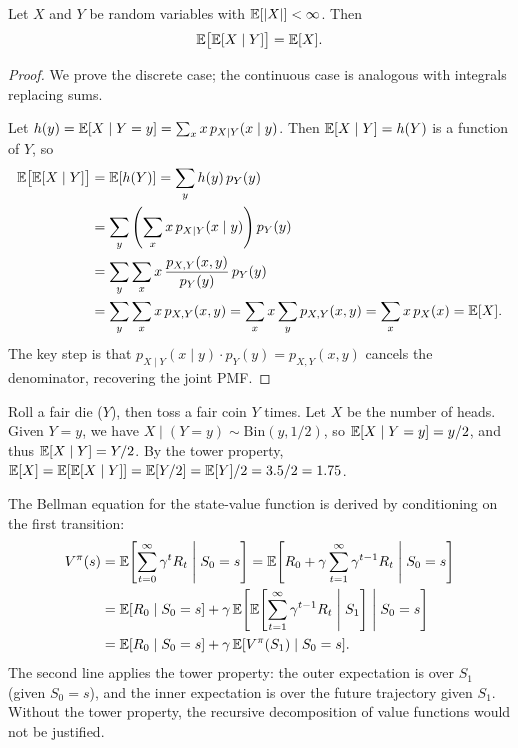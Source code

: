 \documentclass[11pt,a4paper]{article}
\begin{document}
\begin{theorem}
\label{thm:tower}
Let $X$ and $Y$ be random variables with $\mathbb{E}[|X|] < \infty$. Then
\[
    \mathbb{E}\bigl[\mathbb{E}[X \mid Y]\bigr] = \mathbb{E}[X].
\]
\end{theorem}

\begin{proof}
We prove the discrete case; the continuous case is analogous with
integrals replacing sums.

Let $h(y) = \mathbb{E}[X \mid Y = y] = \sum_x x \, p_{X \mid Y}(x \mid y)$.
Then $\mathbb{E}[X \mid Y] = h(Y)$ is a function of $Y$, so
\begin{align*}
    \mathbb{E}\bigl[\mathbb{E}[X \mid Y]\bigr]
    &= \mathbb{E}[h(Y)]
    = \sum_y h(y) \, p_Y(y) \\
    &= \sum_y \left(\sum_x x \, p_{X \mid Y}(x \mid y)\right) p_Y(y) \\
    &= \sum_y \sum_x x \, \frac{p_{X,Y}(x,y)}{p_Y(y)} \, p_Y(y) \\
    &= \sum_y \sum_x x \, p_{X,Y}(x,y)
    = \sum_x x \sum_y p_{X,Y}(x,y)
    = \sum_x x \, p_X(x) = \mathbb{E}[X].
\end{align*}
The key step is that $p_{X\mid Y}(x \mid y) \cdot p_Y(y) = p_{X,Y}(x,y)$
cancels the denominator, recovering the joint PMF.
\end{proof}

\begin{example}
\label{ex:tower_concrete}
Roll a fair die ($Y$), then toss a fair coin $Y$ times. Let $X$ be the
number of heads. Given $Y = y$, we have
$X \mid (Y = y) \sim \mathrm{Bin}(y, 1/2)$, so
$\mathbb{E}[X \mid Y = y] = y/2$, and thus $\mathbb{E}[X \mid Y] = Y/2$.
By the tower property,
$\mathbb{E}[X] = \mathbb{E}[\mathbb{E}[X \mid Y]] = \mathbb{E}[Y/2] = \mathbb{E}[Y]/2 = 3.5/2 = 1.75$.
\end{example}

\begin{rlconnection}[title={Tower Property and the Bellman Equation}]
The Bellman equation for the state-value function is derived by
conditioning on the first transition:
\begin{align*}
    V^\pi(s) &= \mathbb{E}\!\left[\sum_{t=0}^\infty \gamma^t R_t
    \;\middle|\; S_0 = s\right]
    = \mathbb{E}\!\left[R_0 + \gamma \sum_{t=1}^\infty \gamma^{t-1} R_t
    \;\middle|\; S_0 = s\right] \\
    &= \mathbb{E}[R_0 \mid S_0 = s]
    + \gamma \, \mathbb{E}\!\left[\mathbb{E}\!\left[\sum_{t=1}^\infty
    \gamma^{t-1} R_t \;\middle|\; S_1\right]
    \;\middle|\; S_0 = s\right] \\
    &= \mathbb{E}[R_0 \mid S_0 = s] + \gamma \, \mathbb{E}[V^\pi(S_1) \mid S_0 = s].
\end{align*}
The second line applies the tower property: the outer expectation is over
$S_1$ (given $S_0 = s$), and the inner expectation is over the future
trajectory given $S_1$. Without the tower property, the recursive
decomposition of value functions would not be justified.
\end{rlconnection}
\end{document}

